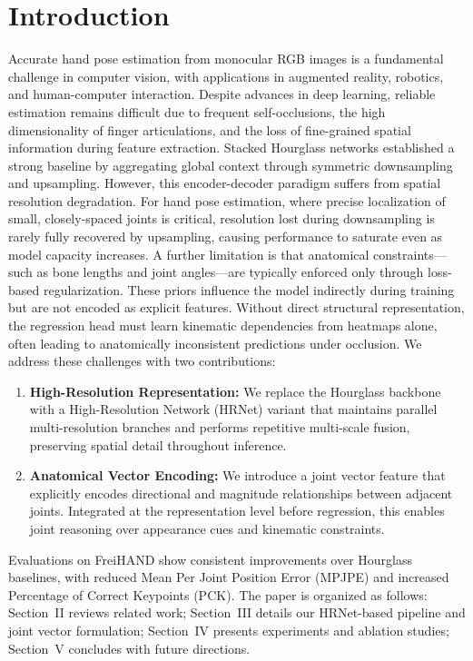 \section{Introduction}
Accurate hand pose estimation from monocular RGB images is a fundamental challenge in computer vision, with applications in augmented reality, robotics, and human-computer interaction. Despite advances in deep learning, reliable estimation remains difficult due to frequent self-occlusions, the high dimensionality of finger articulations, and the loss of fine-grained spatial information during feature extraction.
Stacked Hourglass networks \cite{newell2016stacked} established a strong baseline by aggregating global context through symmetric downsampling and upsampling. However, this encoder-decoder paradigm suffers from spatial resolution degradation. For hand pose estimation, where precise localization of small, closely-spaced joints is critical, resolution lost during downsampling is rarely fully recovered by upsampling, causing performance to saturate even as model capacity increases.
A further limitation is that anatomical constraints—such as bone lengths and joint angles—are typically enforced only through loss-based regularization. These priors influence the model indirectly during training but are not encoded as explicit features. Without direct structural representation, the regression head must learn kinematic dependencies from heatmaps alone, often leading to anatomically inconsistent predictions under occlusion.
We address these challenges with two contributions:

\begin{enumerate}
    \item \textbf{High-Resolution Representation:} We replace the Hourglass backbone with a High-Resolution Network (HRNet) variant that maintains parallel multi-resolution branches and performs repetitive multi-scale fusion, preserving spatial detail throughout inference.

    \item \textbf{Anatomical Vector Encoding:} We introduce a joint vector feature that explicitly encodes directional and magnitude relationships between adjacent joints. Integrated at the representation level before regression, this enables joint reasoning over appearance cues and kinematic constraints.
\end{enumerate}
Evaluations on FreiHAND show consistent improvements over Hourglass baselines, with reduced Mean Per Joint Position Error (MPJPE) and increased Percentage of Correct Keypoints (PCK).
The paper is organized as follows: Section~II reviews related work; Section~III details our HRNet-based pipeline and joint vector formulation; Section~IV presents experiments and ablation studies; Section~V concludes with future directions.


